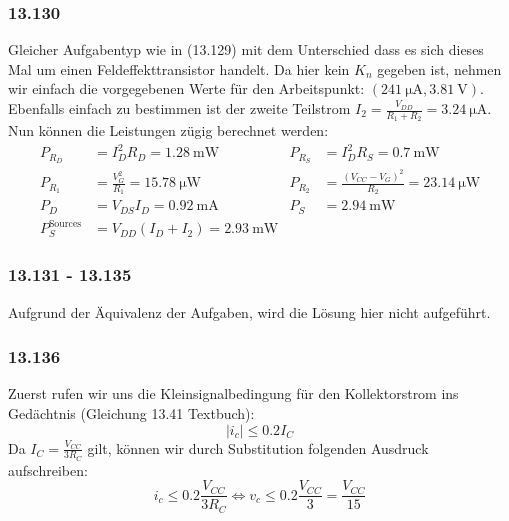 \documentclass[11pt,a4paper,titlepage]{article}
\begin{document}
\subsubsection*{13.130}
Gleicher Aufgabentyp wie in (13.129) mit dem Unterschied dass es sich dieses Mal um einen Feldeffekttransistor handelt. Da hier kein $K_n$ gegeben ist, nehmen wir einfach die vorgegebenen Werte für den Arbeitspunkt: $(\SI{241}{\micro\ampere}, \SI{3.81}{\volt})$. Ebenfalls einfach zu bestimmen ist der zweite Teilstrom $I_2 = \frac{V_{DD}}{R_1+R_2} = \SI{3.24}{\micro\ampere}$. Nun können die Leistungen zügig berechnet werden:
\begin{equation}
\begin{aligned}
  P_{R_D} &= I_D^2R_D = \SI{1.28}{\milli\watt} \qquad &P_{R_S} &= I_D^2R_S = \SI{0.7}{\milli\watt} \\
  P_{R_1} &= \frac{V_G^2}{R_1} = \SI{15.78}{\micro\watt} \qquad &P_{R_2} &= \frac{(V_{CC}-V_G)^2}{R_2} = \SI{23.14}{\micro\watt} \\
  P_D &= V_{DS}I_D = \SI{0.92}{\milli\ampere} \qquad &P_S &= \SI{2.94}{\milli\watt} \\
  P_S^{\text{Sources}} &= V_{DD}(I_D+I_2) = \SI{2.93}{\milli\watt}
\end{aligned}
\end{equation}

\subsubsection*{13.131 - 13.135}
Aufgrund der Äquivalenz der Aufgaben, wird die Lösung hier nicht aufgeführt.

\subsubsection*{13.136}
Zuerst rufen wir uns die Kleinsignalbedingung für den Kollektorstrom ins Gedächtnis (Gleichung 13.41 Textbuch):
\[ |i_c| \leq 0.2I_C \]
Da $I_C = \frac{V_{CC}}{3R_C}$ gilt, können wir durch Substitution folgenden Ausdruck aufschreiben:
\[ i_c \leq 0.2 \frac{V_{CC}}{3R_C} \Leftrightarrow v_c \leq 0.2 \frac{V_{CC}}{3} = \frac{V_{CC}}{15} \]
\end{document}
